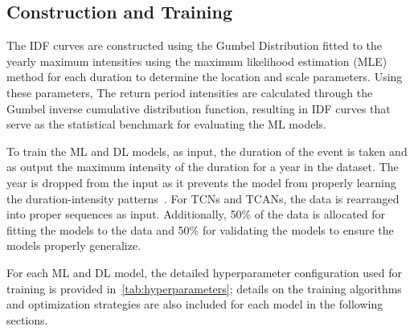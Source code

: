 \subsection{Construction and Training}
The IDF curves are constructed using the Gumbel Distribution fitted to the yearly maximum intensities using the maximum likelihood estimation (MLE) method for each duration to determine the location and scale parameters.
Using these parameters, The return period intensities are calculated through the Gumbel inverse cumulative distribution function, resulting in IDF curves that serve as the statistical benchmark for evaluating the ML models.

\vspace{1em}

To train the ML and DL models, as input, the duration of the event is taken and as output the maximum intensity of the duration for a year in the dataset. The year is dropped from the input as it prevents the model from properly learning the duration-intensity patterns~\cite{14}. For TCNs and TCANs, the data is rearranged into proper sequences as input. Additionally, 50\% of the data is allocated for fitting the models to the data and 50\% for validating the models to ensure the models properly generalize.

\vspace{1em}

For each ML and DL model, the detailed hyperparameter configuration used for training is provided in~\ref{tab:hyperparameters}; details on the training algorithms and optimization strategies are also included for each model in the following sections.





